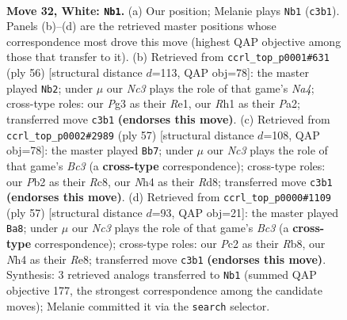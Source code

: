 \documentclass[11pt]{article}
\begin{document}
\begin{figure}[p]
\label{fig:thought-m60}
\end{figure}

\clearpage

\begin{figure}[p]\centering
\begin{subfigure}{0.46\textwidth}\centering
\resizebox{\linewidth}{!}{%
\newchessgame
\chessboard[
  setfen={1nb5/rp4kr/2pqp3/p2p1p1p/Pn1P1P1N/2N3P1/1PPQB1KP/4R2R w - - 17 32},
  showmover=false,
  pgfstyle=straightmove, color=movearrow, markmove={c3-b1}
]}
\caption{}
\end{subfigure}\hfill
\begin{subfigure}{0.46\textwidth}\centering
\resizebox{\linewidth}{!}{%
\newchessgame
\chessboard[
  setfen={1r2r3/2qn1pbk/3p2pp/p1pPp2n/NpP1P3/1P3NPP/P1QB1PK1/3RR3 w - e6 0 29},
  showmover=false,
  pgfstyle=straightmove, color=movearrow, markmove={a4-b2}
]}
\caption{}
\end{subfigure}
\\[4pt]
\begin{subfigure}{0.46\textwidth}\centering
\resizebox{\linewidth}{!}{%
\newchessgame
\chessboard[
  setfen={2rr2k1/p3qpp1/1pbppn1p/4n3/1PP1P3/P1N1Q2P/3N1PP1/3RRBK1 b - - 10 29},
  showmover=false,
  pgfstyle=straightmove, color=movearrow, markmove={c6-b7}
]}
\caption{}
\end{subfigure}\hfill
\begin{subfigure}{0.46\textwidth}\centering
\resizebox{\linewidth}{!}{%
\newchessgame
\chessboard[
  setfen={1r2r1k1/2q2pp1/ppbppnn1/8/1PPNP2p/P1N1QP2/2R3PP/3R1BK1 b - - 10 29},
  showmover=false,
  pgfstyle=straightmove, color=movearrow, markmove={c6-a8}
]}
\caption{}
\end{subfigure}
\caption{\textbf{Move 32, White: \texttt{Nb1}.} (a) Our position; Melanie plays \texttt{Nb1} (\texttt{c3b1}). Panels (b)--(d) are the retrieved master positions whose correspondence most drove this move (highest QAP objective among those that transfer to it). (b) Retrieved from \texttt{ccrl\_top\_p0001\#631} (ply 56) [structural distance $d$=113, QAP obj=78]: the master played \texttt{Nb2}; under $\mu$ our \emph{Nc3} plays the role of that game's \emph{Na4}; cross-type roles: our \emph{P}g3 as their \emph{R}e1, our \emph{R}h1 as their \emph{P}a2; transferred move \texttt{c3b1} \textbf{(endorses this move)}. (c) Retrieved from \texttt{ccrl\_top\_p0002\#2989} (ply 57) [structural distance $d$=108, QAP obj=78]: the master played \texttt{Bb7}; under $\mu$ our \emph{Nc3} plays the role of that game's \emph{Bc3} (a \textbf{cross-type} correspondence); cross-type roles: our \emph{P}b2 as their \emph{R}c8, our \emph{N}h4 as their \emph{R}d8; transferred move \texttt{c3b1} \textbf{(endorses this move)}. (d) Retrieved from \texttt{ccrl\_top\_p0000\#1109} (ply 57) [structural distance $d$=93, QAP obj=21]: the master played \texttt{Ba8}; under $\mu$ our \emph{Nc3} plays the role of that game's \emph{Bc3} (a \textbf{cross-type} correspondence); cross-type roles: our \emph{P}c2 as their \emph{R}b8, our \emph{N}h4 as their \emph{R}e8; transferred move \texttt{c3b1} \textbf{(endorses this move)}. Synthesis: 3 retrieved analogs transferred to \texttt{Nb1} (summed QAP objective 177, the strongest correspondence among the candidate moves); Melanie committed it via the \texttt{search} selector.}

\end{figure}
\end{document}

